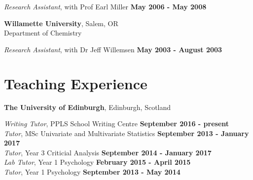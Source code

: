 \documentclass[margin,line]{res}
\begin{document}
\begin{resume}
\vspace{-.2cm}
{\em Research Assistant}, with Prof Earl Miller \hfill {\bf May 2006 - May 2008}\\
\vspace{-.3cm}


\vspace{-.1cm}

{\bf Willamette University}, Salem, OR \\
Department of Chemistry

\vspace{-.2cm}
{\em Research Assistant}, with Dr Jeff Willemsen \hfill {\bf May 2003 - August 2003}\\

\vspace{-.1cm}


\section{\sc Teaching Experience}

{\bf  The University of Edinburgh}, Edinburgh, Scotland

\vspace{-.3cm}

\vspace{.1cm}
{\em Writing Tutor}, PPLS School Writing Centre \hfill {\bf September 2016 - present}\\

\vspace{-.4cm}
{\em Tutor}, MSc Univariate and Multivariate Statistics \hfill {\bf September 2013 - January 2017}\\

\vspace{-.4cm}
{\em Tutor}, Year 3 Criticial Analysis \hfill {\bf September 2014 - January 2017}\\

\vspace{-.4cm}
{\em Lab Tutor}, Year 1 Psychology \hfill {\bf February 2015 - April 2015}\\

\vspace{-.4cm}
{\em Tutor}, Year 1 Psychology \hfill {\bf September 2013 - May 2014}\\
\vspace{-.3cm}


\end{resume}
\end{document}
